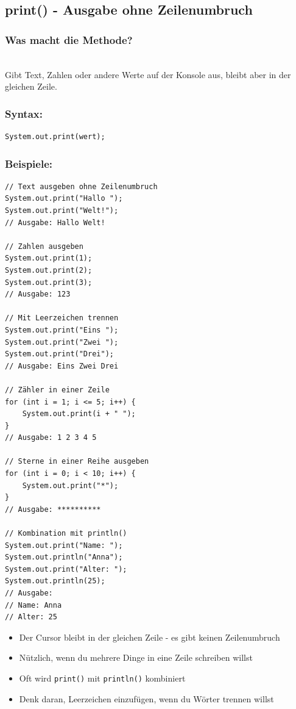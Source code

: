\subsection*{print() - Ausgabe ohne Zeilenumbruch}

\subsubsection*{Was macht die Methode?}\\
Gibt Text, Zahlen oder andere Werte auf der Konsole aus, bleibt aber in der gleichen Zeile.

\subsubsection*{Syntax:}
\begin{lstlisting}
System.out.print(wert);
\end{lstlisting}

\subsubsection*{Beispiele:}
\begin{lstlisting}
// Text ausgeben ohne Zeilenumbruch
System.out.print("Hallo ");
System.out.print("Welt!");
// Ausgabe: Hallo Welt!

// Zahlen ausgeben
System.out.print(1);
System.out.print(2);
System.out.print(3);
// Ausgabe: 123

// Mit Leerzeichen trennen
System.out.print("Eins ");
System.out.print("Zwei ");
System.out.print("Drei");
// Ausgabe: Eins Zwei Drei

// Zähler in einer Zeile
for (int i = 1; i <= 5; i++) {
    System.out.print(i + " ");
}
// Ausgabe: 1 2 3 4 5

// Sterne in einer Reihe ausgeben
for (int i = 0; i < 10; i++) {
    System.out.print("*");
}
// Ausgabe: **********

// Kombination mit println()
System.out.print("Name: ");
System.out.println("Anna");
System.out.print("Alter: ");
System.out.println(25);
// Ausgabe:
// Name: Anna
// Alter: 25
\end{lstlisting}

\begin{achtung}
	\begin{itemize}
		\item Der Cursor bleibt in der gleichen Zeile - es gibt keinen Zeilenumbruch
		\item Nützlich, wenn du mehrere Dinge in eine Zeile schreiben willst
		\item Oft wird \texttt{print()} mit \texttt{println()} kombiniert
		\item Denk daran, Leerzeichen einzufügen, wenn du Wörter trennen willst
	\end{itemize}
\end{achtung}

